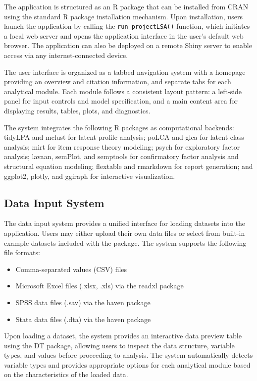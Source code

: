 \documentclass[12pt,a4paper]{article}
\begin{document}
The application is structured as an R package that can be installed from CRAN using the standard R package installation mechanism. Upon installation, users launch the application by calling the \texttt{run\_projectLSA()} function, which initiates a local web server and opens the application interface in the user's default web browser. The application can also be deployed on a remote Shiny server to enable access via any internet-connected device.

The user interface is organized as a tabbed navigation system with a homepage providing an overview and citation information, and separate tabs for each analytical module. Each module follows a consistent layout pattern: a left-side panel for input controls and model specification, and a main content area for displaying results, tables, plots, and diagnostics.

The system integrates the following R packages as computational backends: tidyLPA and mclust for latent profile analysis; poLCA and glca for latent class analysis; mirt for item response theory modeling; psych for exploratory factor analysis; lavaan, semPlot, and semptools for confirmatory factor analysis and structural equation modeling; flextable and rmarkdown for report generation; and ggplot2, plotly, and ggiraph for interactive visualization.

\subsection{Data Input System}

The data input system provides a unified interface for loading datasets into the application. Users may either upload their own data files or select from built-in example datasets included with the package. The system supports the following file formats:

\begin{itemize}[nosep, leftmargin=3em]
\item Comma-separated values (CSV) files
\item Microsoft Excel files (.xlsx, .xls) via the readxl package
\item SPSS data files (.sav) via the haven package
\item Stata data files (.dta) via the haven package
\end{itemize}

Upon loading a dataset, the system provides an interactive data preview table using the DT package, allowing users to inspect the data structure, variable types, and values before proceeding to analysis. The system automatically detects variable types and provides appropriate options for each analytical module based on the characteristics of the loaded data.
\end{document}
